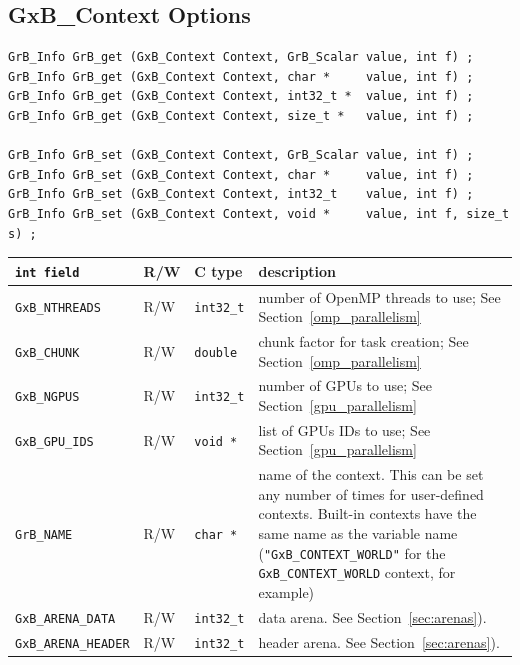 
\newpage
\subsection{{\sf GxB\_Context} Options}
\label{get_set_context}

\begin{mdframed}[userdefinedwidth=6in]
{\footnotesize
\begin{verbatim}
GrB_Info GrB_get (GxB_Context Context, GrB_Scalar value, int f) ;
GrB_Info GrB_get (GxB_Context Context, char *     value, int f) ;
GrB_Info GrB_get (GxB_Context Context, int32_t *  value, int f) ;
GrB_Info GrB_get (GxB_Context Context, size_t *   value, int f) ;

GrB_Info GrB_set (GxB_Context Context, GrB_Scalar value, int f) ;
GrB_Info GrB_set (GxB_Context Context, char *     value, int f) ;
GrB_Info GrB_set (GxB_Context Context, int32_t    value, int f) ;
GrB_Info GrB_set (GxB_Context Context, void *     value, int f, size_t s) ;
\end{verbatim}
}\end{mdframed}

\noindent
{\small
\begin{tabular}{|l|l|l|p{3.5in}|}
\hline
\verb'int field'                    & R/W  & C type        & description \\
\hline
\verb'GxB_NTHREADS' & R/W &
    \verb'int32_t' & number of OpenMP threads to use;
    See Section~\ref{omp_parallelism} \\
\verb'GxB_CHUNK'    & R/W & \verb'double' & chunk factor for task creation;
    See Section~\ref{omp_parallelism} \\
\verb'GxB_NGPUS'    & R/W & 
    \verb'int32_t' & number of GPUs to use;
    See Section~\ref{gpu_parallelism} \\
\verb'GxB_GPU_IDS' & R/W &
    \verb'void *' & list of GPUs IDs to use;
    See Section~\ref{gpu_parallelism} \\
\hline
\verb'GrB_NAME'         & R/W  & \verb'char *' & name of the context.
    This can be set any number of times for user-defined contexts.  Built-in
    contexts have the same name as the variable name (\verb'"GxB_CONTEXT_WORLD"'
    for the \verb'GxB_CONTEXT_WORLD' context, for example) \\
\hline
\verb'GxB_ARENA_DATA'   & R/W & \verb'int32_t' & data arena.  See Section~\ref{sec:arenas}). \\
\verb'GxB_ARENA_HEADER' & R/W & \verb'int32_t' & header arena.  See Section~\ref{sec:arenas}). \\
\hline
\end{tabular}
}

